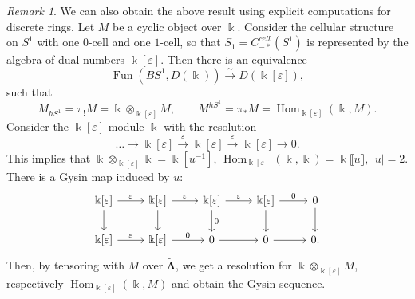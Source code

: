 \documentclass[11pt]{amsart}
\numberwithin{equation}{section}
\theoremstyle{plain}
\theoremstyle{definition}
\theoremstyle{remark}
\newtheorem{RMK}[rmk]{Remark}
\newcommand{\fpw}[1]{{\llbracket #1\rrbracket}}
\newcommand\Fun{\operatorname{Fun}}
\newcommand\Hom{\operatorname{Hom}}
\begin{document}
\begin{RMK}
    We can also obtain the above result using explicit computations for discrete rings. Let $M$ be a cyclic object over $\Bbbk$. Consider the cellular structure on $S^1$ with one $0$-cell and one $1$-cell, so that $S_1 = C_{-*}^{cell}(S^1)$ is represented by the algebra of dual numbers $\Bbbk[\varepsilon]$. Then there is an equivalence
    \[\Fun(BS^1, D(\Bbbk)) \xrightarrow{\sim} D(\Bbbk[\varepsilon]),\]
    such that
    \[M_{hS^1} = \pi_!M = \Bbbk \otimes_{\Bbbk[\varepsilon]} M,\qquad M^{hS^1} = \pi_*M = \Hom_{\Bbbk[\varepsilon]} ( \Bbbk,M).\]
    Consider the $\Bbbk[\varepsilon]$-module $\Bbbk$ with the resolution
    \[\dots \rightarrow \Bbbk[\varepsilon] \xrightarrow{\varepsilon} \Bbbk[\varepsilon] \xrightarrow{\varepsilon} \Bbbk[\varepsilon] \rightarrow 0.\]
    This implies that $\Bbbk \otimes_{\Bbbk[\varepsilon]} \Bbbk = \Bbbk[u^{-1}]$, $\Hom_{\Bbbk[\varepsilon]}(\Bbbk, \Bbbk) = \Bbbk\fpw{u}, \, |u| = 2$. There is a Gysin map induced by $u$:
    \[\begin{tikzcd}
{\Bbbk[\varepsilon]} \arrow[r, "{\varepsilon}"] \arrow[d] & {\Bbbk[\varepsilon]} \arrow[r, "{\varepsilon}"] \arrow[d] & {\Bbbk[\varepsilon]} \arrow[r, "{\varepsilon}"] \arrow[d, "0"] & {\Bbbk[\varepsilon]} \arrow[r, "{0}"] \arrow[d] & 0 \arrow[d] \\
{\Bbbk[\varepsilon]} \arrow[r, "{\varepsilon}"]           & {\Bbbk[\varepsilon]} \arrow[r, "{0}"]                             & 0 \arrow[r]                                                          & 0 \arrow[r]                                                       & 0  .     
\end{tikzcd}\]
    Then, by tensoring with $M$ over $\widetilde{\boldsymbol{\Lambda}}$, we get a resolution for $\Bbbk \otimes_{\Bbbk[\varepsilon]} M$, respectively $\Hom_{\Bbbk[\varepsilon]}(\Bbbk, M)$ and obtain the Gysin sequence.
\end{RMK}
\end{document}
